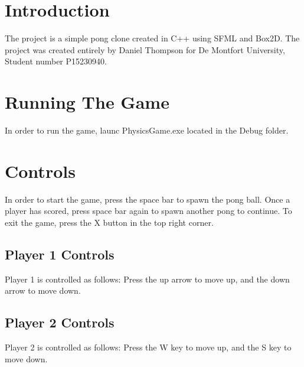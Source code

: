 \hypertarget{index_intro_sec}{}\section{Introduction}\label{index_intro_sec}
The project is a simple pong clone created in C++ using S\+F\+ML and Box2D. The project was created entirely by Daniel Thompson for De Montfort University, Student number P15230940.\hypertarget{index_running_sec}{}\section{Running The Game}\label{index_running_sec}
In order to run the game, launc Physics\+Game.\+exe located in the Debug folder.\hypertarget{index_controls_sec}{}\section{Controls}\label{index_controls_sec}
In order to start the game, press the space bar to spawn the pong ball. Once a player has scored, press space bar again to spawn another pong to continue. To exit the game, press the X button in the top right corner.\hypertarget{index_player1}{}\subsection{Player 1 Controls}\label{index_player1}
Player 1 is controlled as follows\+: Press the up arrow to move up, and the down arrow to move down.\hypertarget{index_player2}{}\subsection{Player 2 Controls}\label{index_player2}
Player 2 is controlled as follows\+: Press the W key to move up, and the S key to move down. 